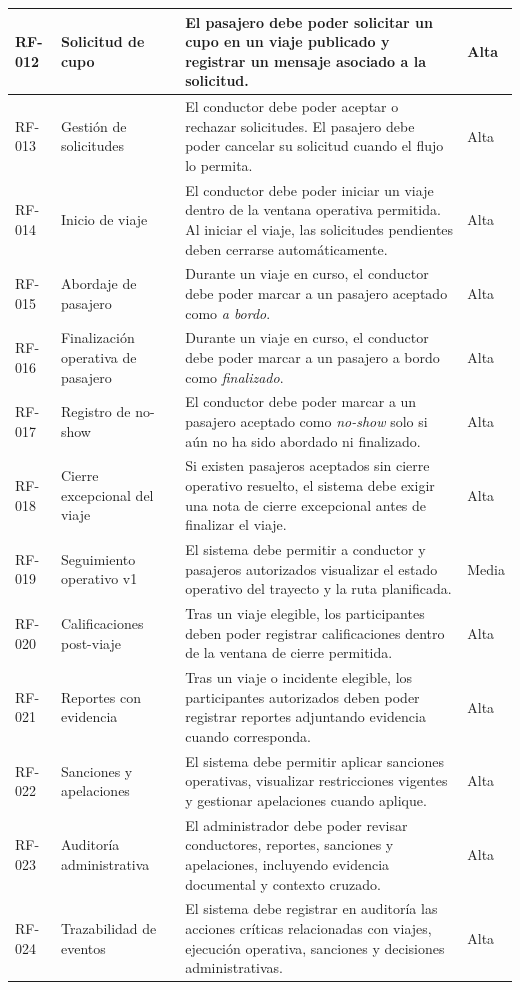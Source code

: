 \documentclass{article}
\begin{document}
\begin{longtable}{|P{1.8cm}|P{3.8cm}|P{7.2cm}|P{2.2cm}|}
\hline
RF-012 & Solicitud de cupo & El pasajero debe poder solicitar un cupo en un viaje publicado y registrar un mensaje asociado a la solicitud. & Alta \\
\hline
RF-013 & Gestión de solicitudes & El conductor debe poder aceptar o rechazar solicitudes. El pasajero debe poder cancelar su solicitud cuando el flujo lo permita. & Alta \\
\hline
RF-014 & Inicio de viaje & El conductor debe poder iniciar un viaje dentro de la ventana operativa permitida. Al iniciar el viaje, las solicitudes pendientes deben cerrarse automáticamente. & Alta \\
\hline
RF-015 & Abordaje de pasajero & Durante un viaje en curso, el conductor debe poder marcar a un pasajero aceptado como \textit{a bordo}. & Alta \\
\hline
RF-016 & Finalización operativa de pasajero & Durante un viaje en curso, el conductor debe poder marcar a un pasajero a bordo como \textit{finalizado}. & Alta \\
\hline
RF-017 & Registro de no-show & El conductor debe poder marcar a un pasajero aceptado como \textit{no-show} solo si aún no ha sido abordado ni finalizado. & Alta \\
\hline
RF-018 & Cierre excepcional del viaje & Si existen pasajeros aceptados sin cierre operativo resuelto, el sistema debe exigir una nota de cierre excepcional antes de finalizar el viaje. & Alta \\
\hline
RF-019 & Seguimiento operativo v1 & El sistema debe permitir a conductor y pasajeros autorizados visualizar el estado operativo del trayecto y la ruta planificada. & Media \\
\hline
RF-020 & Calificaciones post-viaje & Tras un viaje elegible, los participantes deben poder registrar calificaciones dentro de la ventana de cierre permitida. & Alta \\
\hline
RF-021 & Reportes con evidencia & Tras un viaje o incidente elegible, los participantes autorizados deben poder registrar reportes adjuntando evidencia cuando corresponda. & Alta \\
\hline
RF-022 & Sanciones y apelaciones & El sistema debe permitir aplicar sanciones operativas, visualizar restricciones vigentes y gestionar apelaciones cuando aplique. & Alta \\
\hline
RF-023 & Auditoría administrativa & El administrador debe poder revisar conductores, reportes, sanciones y apelaciones, incluyendo evidencia documental y contexto cruzado. & Alta \\
\hline
RF-024 & Trazabilidad de eventos & El sistema debe registrar en auditoría las acciones críticas relacionadas con viajes, ejecución operativa, sanciones y decisiones administrativas. & Alta \\
\hline
\end{longtable}
\end{document}
